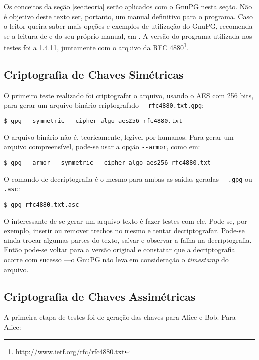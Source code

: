 \documentclass[12px,a4paper,twoside]{article}
\begin{document}
Os conceitos da seção \ref{sec:teoria} serão aplicados com o GnuPG nesta seção.
Não é objetivo deste texto ser, portanto, um manual definitivo para o programa.
Caso o leitor queira saber mais opções e exemplos de utilização do GnuPG,
recomenda-se a leitura de \cite{oliveira:1} e do seu próprio manual, em
\cite{gnupg:man}.  A versão do programa utilizada nos testes foi a 1.4.11,
juntamente com o arquivo da RFC
4880\footnote{\url{http://www.ietf.org/rfc/rfc4880.txt}}.

\subsection{Criptografia de Chaves Simétricas}
\label{sec:pratica:simetrica}
O primeiro teste realizado foi criptografar o arquivo, usando o AES com 256
bits, para gerar um arquivo binário criptografado ---\texttt{rfc4880.txt.gpg}:

\begin{verbatim}
$ gpg --symmetric --cipher-algo aes256 rfc4880.txt
\end{verbatim}

O arquivo binário não é, teoricamente, legível por humanos.  Para gerar um
arquivo compreensível, pode-se usar a opção \texttt{-{}-armor}, como em:

\begin{verbatim}
$ gpg --armor --symmetric --cipher-algo aes256 rfc4880.txt
\end{verbatim}

O comando de decriptografia é o mesmo para ambas as saídas geradas
---\texttt{.gpg} ou \texttt{.asc}:

\begin{verbatim}
$ gpg rfc4880.txt.asc
\end{verbatim}

O interessante de se gerar um arquivo texto é fazer testes com ele.  Pode-se,
por exemplo, inserir ou remover trechos no mesmo e tentar decriptografar.
Pode-se ainda trocar algumas partes do texto, salvar e observar a falha na
decriptografia.  Então pode-se voltar para a versão original e constatar que a
decriptografia ocorre com sucesso ---o GnuPG não leva em consideração o
\textit{timestamp} do arquivo.

\subsection{Criptografia de Chaves Assimétricas}
\label{sec:pratica:assimetrica}
A primeira etapa de testes foi de geração das chaves para Alice e Bob.  Para
Alice:
\end{document}
